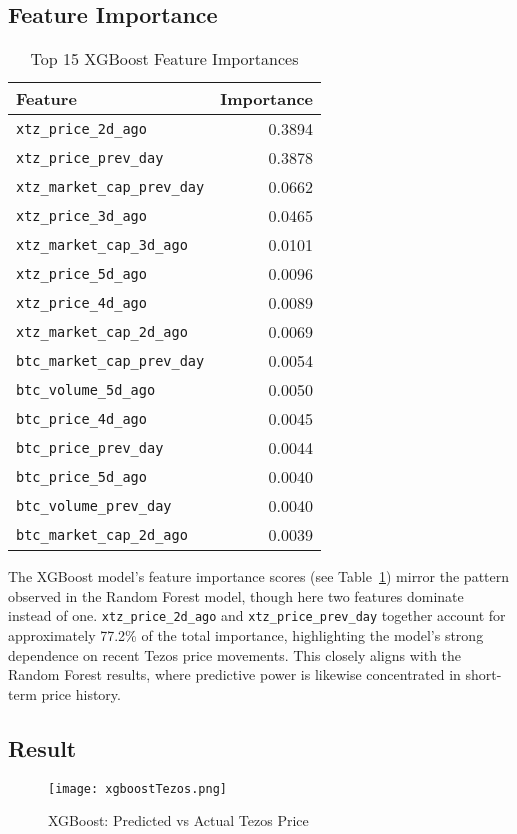 \subsection{Feature Importance}
\begin{table}[H]
\centering
\caption{Top 15 XGBoost Feature Importances}
\label{tab:xgboost-feature-importance}
\begin{tabular}{lr}
\toprule
\textbf{Feature} & \textbf{Importance} \\
\midrule
\texttt{xtz\_price\_2d\_ago}       & 0.3894 \\
\texttt{xtz\_price\_prev\_day}     & 0.3878 \\
\texttt{xtz\_market\_cap\_prev\_day} & 0.0662 \\
\texttt{xtz\_price\_3d\_ago}       & 0.0465 \\
\texttt{xtz\_market\_cap\_3d\_ago} & 0.0101 \\
\texttt{xtz\_price\_5d\_ago}       & 0.0096 \\
\texttt{xtz\_price\_4d\_ago}       & 0.0089 \\
\texttt{xtz\_market\_cap\_2d\_ago} & 0.0069 \\
\texttt{btc\_market\_cap\_prev\_day} & 0.0054 \\
\texttt{btc\_volume\_5d\_ago}      & 0.0050 \\
\texttt{btc\_price\_4d\_ago}       & 0.0045 \\
\texttt{btc\_price\_prev\_day}     & 0.0044 \\
\texttt{btc\_price\_5d\_ago}       & 0.0040 \\
\texttt{btc\_volume\_prev\_day}    & 0.0040 \\
\texttt{btc\_market\_cap\_2d\_ago} & 0.0039 \\
\bottomrule
\end{tabular}
\end{table}

The XGBoost model’s feature importance scores (see Table~\ref{tab:xgboost-feature-importance}) mirror the pattern observed in the Random Forest model, though here two features dominate instead of one. \texttt{xtz\_price\_2d\_ago} and \texttt{xtz\_price\_prev\_day} together account for approximately 77.2\% of the total importance, highlighting the model’s strong dependence on recent Tezos price movements. This closely aligns with the Random Forest results, where predictive power is likewise concentrated in short-term price history.

\subsection{Result}
\begin{figure}[H]
    \centering
    \texttt{[image: xgboostTezos.png]}
    \caption{XGBoost: Predicted vs Actual Tezos Price}
    \label{fig:xgboost-tezos}
\end{figure}


